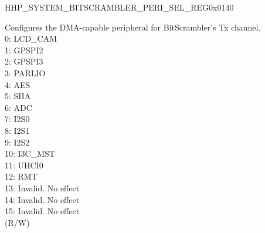 \begin{register}{H}{HP\_SYSTEM\_BITSCRAMBLER\_PERI\_SEL\_REG}{0x0140}
\begin{regdesc}\begin{reglist}
\item [Continued from the previous page...]
\label{fielddesc:HPSYSTEMBITSCRAMBLERPERITXSEL}\item [HP\_SYSTEM\_BITSCRAMBLER\_PERI\_TX\_SEL] Configures the DMA-capable peripheral for BitScrambler's Tx channel. \\
0: LCD\_CAM \\
1: GPSPI2 \\
2: GPSPI3 \\
3: PARLIO \\
4: AES \\
5: SHA \\
6: ADC \\
7: I2S0 \\
8: I2S1 \\
9: I2S2 \\
10: I3C\_MST \\
11: UHCI0 \\
12: RMT \\
13: Invalid. No effect\\
14: Invalid. No effect\\
15: Invalid. No effect\\
(R/W)
\end{reglist}\end{regdesc}
\end{register}


